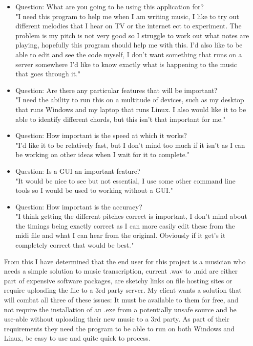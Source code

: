 \documentclass[12pt]{report}
\begin{document}
\begin{itemize}
\item Question: What are you going to be using this application for?\\
"I need this program to help me when I am writing music, I like to try out different melodies that I hear on TV or the internet ect to experiment. The problem is my pitch is not very good so I struggle to work out what notes are playing, hopefully this program should help me with this. I'd also like to be able to edit and see the code myself, I don't want something that runs on a server somewhere I'd like to know exactly what is happening to the music that goes through it."
\item Question: Are there any particular features that will be important?\\ 
"I need the ability to run this on a multitude of devices, such as my desktop that runs Windows and my laptop that runs Linux. I also would like it to be able to identify different chords, but this isn't that important for me."
\item Question: How important is the speed at which it works?\\ 
"I'd like it to be relatively fast, but I don't mind too much if it isn't as I can be working on other ideas when I wait for it to complete."
\item Question: Is a GUI an important feature?\\ 
"It would be nice to see but not essential, I use some other command line tools so I would be used to working without a GUI."
\item Question: How important is the accuracy?\\ "I think getting the different pitches correct is important, I don't mind about the timings being exactly correct as I can more easily edit these from the midi file and what I can hear from the original. Obviously if it get's it completely correct that would be best."
\end{itemize}

From this I have determined that the end user for this project is a musician who needs a simple solution to music transcription, current .wav to .mid are either part of expensive software packages, are sketchy links on file hosting sites or require uploading the file to a 3rd party server. My client wants a solution that will combat all three of these issues: It must be available to them for free, and not require the installation of an .exe from a potentially unsafe source and be use-able without uploading their new music to a 3rd party. As part of their requirements they need the program to be able to run on both Windows and Linux, be easy to use and quite quick to process.
\end{document}
